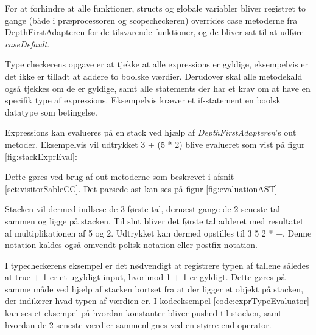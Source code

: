 \noindent For at forhindre at alle funktioner, structs og globale variabler bliver registret to gange (både i præprocessoren og scopecheckeren) overrides case metoderne fra DepthFirstAdapteren for de tilsvarende funktioner, og de bliver sat til at udføre \textit{caseDefault}.

Type checkerens opgave er at tjekke at alle expressions er gyldige, eksempelvis er det ikke er tilladt at addere to boolske værdier. Derudover skal alle metodekald også tjekkes om de er gyldige, samt alle statements der har et krav om at have en specifik type af expressions. Eksempelvis kræver et if-statement en boolsk datatype som betingelse.

Expressions kan evalueres på en stack ved hjælp af \textit{DepthFirstAdapteren}'s out metoder. Eksempelvis vil udtrykket 3 + (5 * 2) blive evalueret som vist på figur \ref{fig:stackExprEval}:


\noindent Dette gøres ved brug af out metoderne som beskrevet i afsnit \ref{sct:visitorSableCC}. Det parsede \gls{ast} kan ses på figur \ref{fig:evaluationAST}

Stacken vil dermed indlæse de 3 første tal, dernæst gange de 2 seneste tal sammen og ligge på stacken. Til slut bliver det første tal adderet med resultatet af multiplikationen af 5 og 2. Udtrykket kan dermed opstilles til 3 5 2 * +. Denne notation kaldes også omvendt polisk notation \cite{CraftingCompiler_2009} eller postfix notation.

I typecheckerens eksempel er det nødvendigt at registrere typen af tallene således at true + 1 er et ugyldigt input, hvorimod 1 + 1 er gyldigt. Dette gøres på samme måde ved hjælp af stacken bortset fra at der ligger et objekt på stacken, der indikerer hvad typen af værdien er. I kodeeksempel \ref{code:exprTypeEvaluator} kan ses et eksempel på hvordan konstanter bliver pushed til stacken, samt hvordan de 2 seneste værdier sammenlignes ved en større end operator.  


